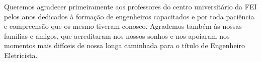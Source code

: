 \documentclass[../../layout.tex]{subfiles}
\begin{document}
\begin{agradecimentos}
Queremos agradecer primeiramente aos professores do centro universitário da FEI pelos anos dedicados à formação de engenheiros capacitados e por toda paciência e compreensão que os mesmo tiveram conosco. Agrademos também às nossas famílias e amigos, que acreditaram nos nossos sonhos e nos apoiaram nos momentos mais difíceis de nossa longa caminhada para o título de Engenheiro Eletricista.
\end{agradecimentos}
\end{document}
